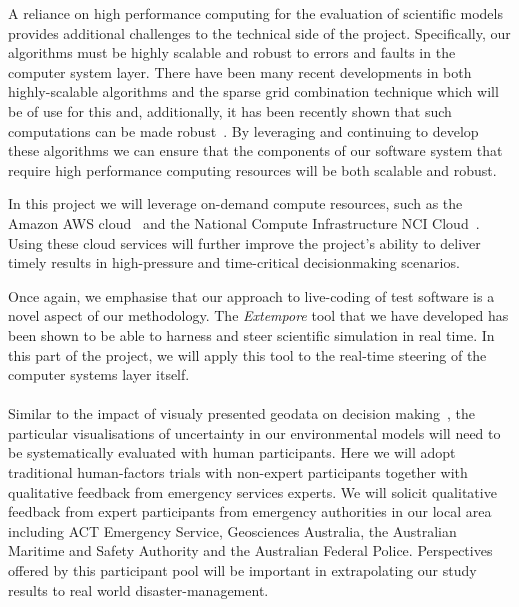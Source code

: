 \documentclass[a4paper,fontsize=12pt]{scrartcl}
\begin{document}
A reliance on high performance computing for the evaluation of scientific 
models provides additional challenges to the technical side of the project. 
Specifically, our algorithms must be highly scalable and robust to errors and faults in the computer system layer.
There have been many recent developments in both highly-scalable algorithms 
and the sparse grid combination technique which will be of use for this and,
additionally, it has been recently shown that such computations can be made robust~\parencite{HardingHLS2015,AliEtal2015}.
By leveraging and continuing to develop these algorithms we can ensure that
the components of our software system that require high performance 
computing resources will be both scalable and robust.

In this project we will leverage on-demand compute resources, such as
the Amazon AWS cloud~\parencite{amazon_aws} and the National Compute
Infrastructure NCI Cloud~\parencite{nci_cloud}. Using these cloud
services will further improve the project's ability to deliver timely
results in high-pressure and time-critical decisionmaking scenarios.

Once again, we emphasise that our approach to live-coding of test software is a novel aspect of our methodology. The {\em Extempore} tool that we have developed has been shown to be able to harness and steer scientific simulation in real time. In this part of the project, we will apply this tool to the real-time steering of the computer systems layer itself.\\


\\

Similar to the impact of visualy presented geodata on decision making~\parencite{kinkeldey2015evaluating}, the particular visualisations of 
uncertainty in our environmental models will need to be systematically evaluated with 
human participants. Here we will adopt traditional human-factors trials with non-expert participants together with qualitative feedback from emergency services experts. We will solicit qualitative feedback from expert participants from emergency authorities in our local area including ACT Emergency Service, Geosciences Australia, the Australian Maritime and Safety Authority and the Australian Federal Police. Perspectives offered by this participant pool will be important in extrapolating our study results to real world disaster-management. 
\end{document}
